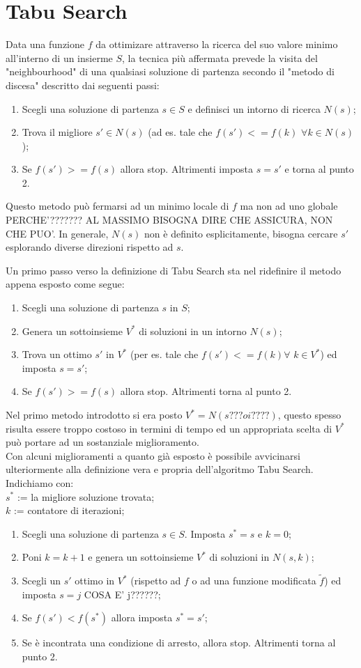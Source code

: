 \section{Tabu Search}
Data una funzione $f$ da ottimizare attraverso la ricerca del suo valore minimo all'interno di un insierme $S$, la tecnica più affermata prevede la visita del "neighbourhood" di una qualsiasi soluzione di partenza secondo il "metodo di discesa" descritto dai seguenti passi:
\begin{enumerate}
\item Scegli una soluzione di partenza $s \in S$ e definisci un intorno di ricerca $N(s)$;
\item Trova il migliore $s' \in N(s)$ (ad es. tale che $f(s')<=f(k)$ $\forall k \in N(s)$);
\item Se $f(s')>=f(s)$ allora stop. Altrimenti imposta $s=s'$ e torna al punto 2.
\end{enumerate}
Questo metodo può fermarsi ad un minimo locale di $f$ ma non ad uno globale PERCHE'??????? AL MASSIMO BISOGNA DIRE CHE ASSICURA, NON CHE PUO'. In generale, $N(s)$ non è definito esplicitamente, bisogna cercare $s'$ esplorando diverse direzioni rispetto ad $s$.

Un primo passo verso la definizione di Tabu Search sta nel ridefinire il metodo appena esposto come segue:
\begin{enumerate}
\item Scegli una soluzione di partenza $s$ in $S$;
\item Genera un sottoinsieme $V^*$ di soluzioni in un intorno $N(s)$;
\item Trova un ottimo $s'$ in $V^*$ (per es. tale che $f(s')<=f(k) \forall$ $k \in V^*$) ed imposta $s=s'$;
\item Se $f(s')>=f(s)$ allora stop. Altrimenti torna al punto 2.
\end{enumerate}
Nel primo metodo introdotto si era posto $V^* = N(s??? o i????)$, questo spesso risulta essere troppo costoso in termini di tempo ed un appropriata scelta di $V^*$ può portare ad un sostanziale miglioramento.\\

Con alcuni miglioramenti a quanto già esposto è possibile avvicinarsi ulteriormente alla definizione vera e propria dell'algoritmo Tabu Search.\\
Indichiamo con:\\ 
$s^*$ := la migliore soluzione trovata;\\
$k$ := contatore di iterazioni;
\begin{enumerate}
\item Scegli una soluzione di partenza $s \in S$. Imposta $s^*=s$ e $k=0$;
\item Poni $k = k+1$ e genera un sottoinsieme $V^*$ di soluzioni in $N(s,k)$;
\item Scegli un $s'$ ottimo in $V^*$ (rispetto ad $f$ o ad una funzione modificata $\widetilde{f}$) ed imposta $s=j$ COSA E' j??????;
\item Se $f(s')<f(s^*)$ allora imposta $s^*=s'$;
\item Se è incontrata una condizione di arresto, allora stop. Altrimenti torna al punto 2.
\end{enumerate}

